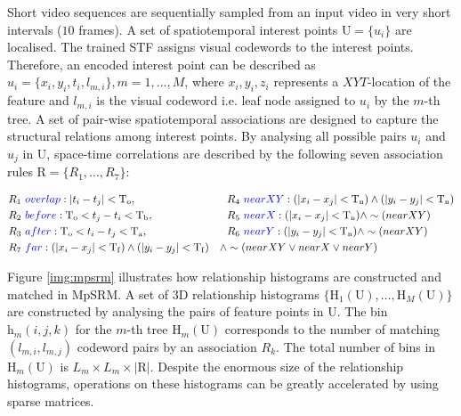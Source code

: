 Short video sequences are sequentially sampled from an input video in very short intervals (\eg$10$ frames). A set of spatiotemporal interest points $\mathrm{U} = \{u_{i}\}$ are localised. The trained STF assigns visual codewords to the interest points. Therefore, an encoded interest point can be described as $u_{i} = \{x_i, y_i, t_i, l_{m,i}\}, m=1,...,M$, where $x_i, y_i, z_i$ represents a $XYT$-location of the feature and $l_{m,i}$ is the visual codeword i.e. leaf node assigned to $u_{i}$ by the $m$-th tree. A set of pair-wise spatiotemporal associations are designed to capture the structural relations among interest points. By analysing all possible pairs $u_i$ and $u_j$ in $\mathrm{U}$, space-time correlations are described by the following seven association rules $\mathrm{R} = \{ R_1,\dots,R_7\}$:

\begin{align*}%
& R_{1} ~{\color{blue}overlap}: |t_i - t_j| < \mathrm{T_{o}},   & & R_{4}~{\color{blue}nearXY}: (|x_i - x_j| < \mathrm{T_{n}}) \wedge (|y_i - y_j| < \mathrm{T_{n}}) \nonumber\\
& R_{2} ~{\color{blue}before}: \mathrm{T_{o}} < t_j - t_i < \mathrm{T_{b}}, & & R_{5}~{\color{blue}nearX}: (|x_i - x_j| < \mathrm{T_{n}}) \wedge \sim(nearXY)\nonumber\\
& R_{3} ~{\color{blue}after}: \mathrm{T_{o}} < t_i - t_j < \mathrm{T_{a}}, & & R_{6}~{\color{blue}nearY}: (|y_i - y_j| < \mathrm{T_{n}}) \wedge \sim(nearXY)\nonumber\\
& R_{7} ~{\color{blue}far}: (|x_i - x_j| < \mathrm{T_{f}}) \wedge (|y_i - y_j| < \mathrm{T_{f}}) & \wedge & \sim(nearXY \vee nearX \vee nearY)
\vspace{-3mm}
\end{align*}

Figure \ref{img:mpsrm} illustrates how relationship histograms are constructed and matched in MpSRM. A set of 3D relationship histograms $\{ \mathrm{H}_1(\mathrm{U}),\dots,\mathrm{H}_{M}(\mathrm{U})\}$ are constructed by analysing the pairs of feature points in $\mathrm{U}$. The bin $\mathrm{h}_{m}(i,j,k)$ for the $m$-th tree $\mathrm{H}_{m}(\mathrm{U})$ corresponds to the number of matching $(l_{m,i},l_{m,j})$ codeword pairs by an association $R_k$. The total number of bins in $\mathrm{H}_m(\mathrm{U})$ is $L_m \times L_m \times |\mathrm{R}|$. Despite the enormous size of the relationship histograms, operations on these histograms can be greatly accelerated by using sparse matrices.

